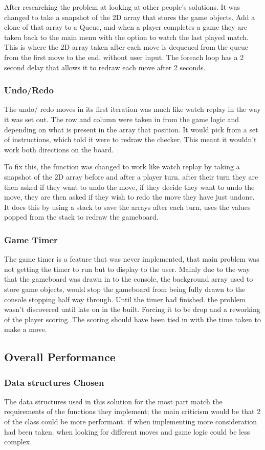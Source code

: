 \documentclass[10pt, a4paper]{article}
\begin{document}
After researching the problem at looking at other people's solutions. It was changed to take a snapshot of the 2D array that stores the game objects. Add a clone of that array to a Queue, and when a player completes a game they are taken back to the main menu with the option to watch the last played match. This is where the 2D array taken after each move is dequeued from the queue from the first move to the end, without user input. The foreach loop has a 2 second delay that allows it to redraw each move after 2 seconds.
	\subsubsection{Undo/Redo}
The undo/ redo moves in its first iteration was much like watch replay in the way it was set out. The row and column were taken in from the game logic and depending on what is present in the array that position. It would pick from a set of instructions, which told it were to redraw the checker. This meant it wouldn't work both directions on the board.

To fix this, the function was changed to work like watch replay by taking a snapshot of the 2D array before and after a player turn. after their turn they are then asked if they want to undo the move, if they decide they want to undo the move, they are then asked if they wish to redo the move they have just undone. It does this by using a stack to save the arrays after each turn, uses the values popped from the stack to redraw the gameboard.

	\subsubsection{Game Timer}
The game timer is a feature that was never implemented, that main problem was not getting the timer to run but to display to the user. Mainly due to the way that the gameboard was drawn in to the console, the background array used to store game objects, would stop the gameboard from being fully drawn to the console stopping half way through. Until the timer had finished. the problem wasn't discovered until late on in the built. Forcing it to be drop and a reworking of the player scoring. The scoring should have been tied in with the time taken to make a move.

	\subsection{Overall Performance}	
	\subsubsection{Data structures Chosen}
The data structures used in this solution for the most part match the requirements of the functions they implement; the main criticism would be that 2 of the class could be more performant. if when implementing more consideration had been taken. when looking for different moves and game logic could be less complex.
\end{document}
